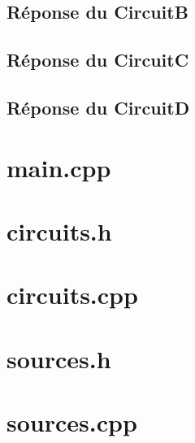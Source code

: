 \documentclass[a4paper,11pt]{article}
\begin{document}
  \subsection{Réponse du CircuitB}
 
   
    
  \subsection{Réponse du CircuitC}
  \subsection{Réponse du CircuitD}

  \appendix
  \newpage
  \section{main.cpp}
    
    \newpage
  \section{circuits.h}
    
    \newpage
  \section{circuits.cpp}
    
    \newpage
   \section{sources.h}
    
    \newpage
   \section{sources.cpp}
    
    \newpage
\end{document}
